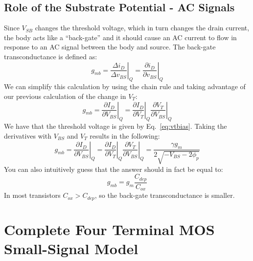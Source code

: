 \subsection{Role of the Substrate Potential - AC Signals}
Since $V_{SB}$ changes the threshold voltage, which in turn changes the drain current, the body acts like a ``back-gate” and it should cause an AC current to flow in response to an AC signal between the body and source.  The back-gate transconductance is defined as:
\begin{equation} 
	{g_{mb}} = {\left. {\frac{{\Delta {i_D}}}{{\Delta {v_{BS}}}}} \right|_Q} = {\left. {\frac{{\partial {i_D}}}{{\partial {v_{BS}}}}} \right|_Q} 
\end{equation}
We can simplify this calculation by using the chain rule and taking advantage of our previous calculation of the change in $V_T$:
\begin{equation}
	{g_{mb}} = {\left. {\frac{{\partial {I_D}}}{{\partial {V_{BS}}}}} \right|_Q} = {\left. {\frac{{\partial {I_D}}}{{\partial {V_{T}}}}} \right|_Q}{\left. {\frac{{\partial {V_{T}}}}{{\partial {V_{BS}}}}} \right|_Q}
\end{equation}
We have that the threshold voltage is given by Eq.~\ref{eq:vtbias}.  Taking the derivatives with $V_{BS}$ and $V_T$ results in the following:
\begin{equation}
	{g_{mb}} = {\left. {\frac{{\partial {I_D}}}{{\partial {V_{BS}}}}} \right|_Q} 
= {\left. {\frac{{\partial {I_D}}}{{\partial {V_{T}}}}} \right|_Q}{\left. {\frac{{\partial {V_{T}}}}{{\partial {V_{BS}}}}} \right|_Q} = \frac{{\gamma {g_m}}}{{2\sqrt { - {V_{BS}} - 2{\phi _p}} }}
\end{equation}
You can also intuitively guess that the answer should in fact be equal to:
\begin{equation}
	g_{mb} = g_m \frac{C_{dep}}{C_{ox}}
\end{equation}
In most transistors $C_{ox} > C_{dep}$, so the back-gate transconductance is smaller.   
\section{Complete Four Terminal MOS Small-Signal Model}
